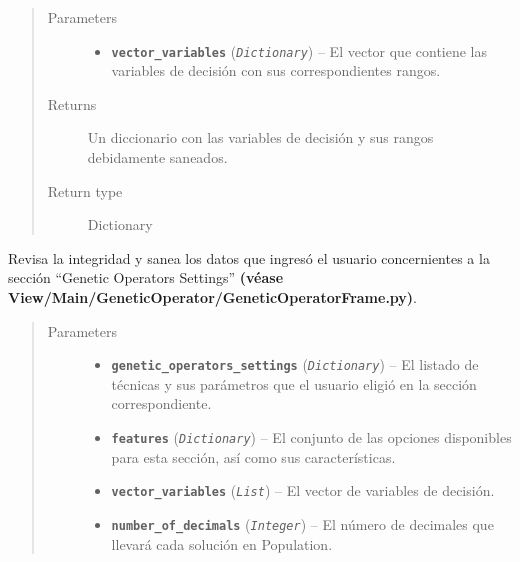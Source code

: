 \documentclass[class=report, crop=false]{standalone}
\begin{document}
\begin{fulllineitems}
\begin{fulllineitems}
\begin{quote}\begin{description}
\item[{Parameters}] \leavevmode\begin{itemize}
\item \textbf{\texttt{vector\_variables}} (\emph{\texttt{Dictionary}}) -- El vector que contiene las variables de decisión con sus correspondientes rangos.
\end{itemize}
\item[{Returns}] \leavevmode
Un diccionario con las variables de decisión y sus rangos debidamente saneados.
\item[{Return type}] \leavevmode
Dictionary
\end{description}\end{quote}

\end{fulllineitems}

\begin{fulllineitems}

Revisa la integridad y sanea los datos que ingresó el usuario 
concernientes a la sección ``Genetic Operators Settings''
\textbf{(véase View/Main}\break\textbf{/GeneticOperator/GeneticOperatorFrame.py)}.

\begin{quote}\begin{description}
\item[{Parameters}] \leavevmode\begin{itemize}
\item \textbf{\texttt{genetic\_operators\_settings}} (\emph{\texttt{Dictionary}}) -- El listado de técnicas y sus parámetros que el usuario
eligió en la sección correspondiente.
\item \textbf{\texttt{features}} (\emph{\texttt{Dictionary}}) -- El conjunto de las opciones disponibles para esta sección, así como sus características.
\item \textbf{\texttt{vector\_variables}} (\emph{\texttt{List}}) -- El vector de variables de decisión.
\item \textbf{\texttt{number\_of\_decimals}} (\emph{\texttt{Integer}}) -- El número de decimales que llevará cada solución en Population.
\end{itemize}


\end{description}
\end{quote}
\end{fulllineitems}
\end{fulllineitems}
\end{document}
